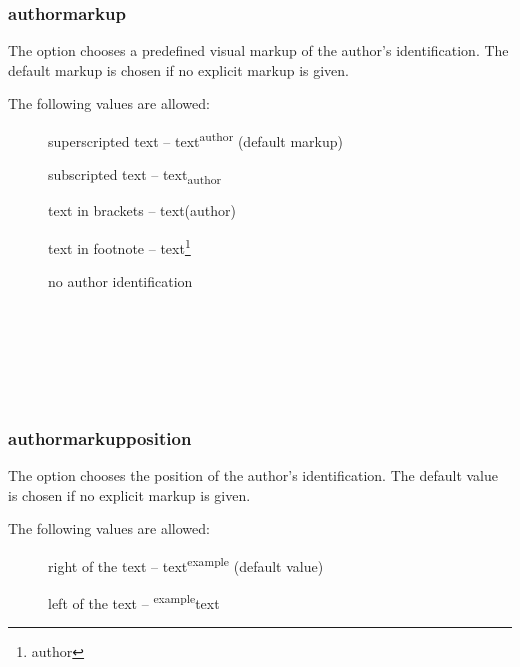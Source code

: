 \subsubsection{authormarkup}

The  option chooses a predefined visual markup of the author's identification.
The default markup is chosen if no explicit markup is given.

The following values are allowed:
\begin{description}
	\item [] superscripted text -- text\textsuperscript{author} (default markup)
	\item [] subscripted text -- text\textsubscript{author}
	\item [] text in brackets -- text(author)
	\item [] text in footnote -- text\footnote{author}
	\item [] no author identification
\end{description}

\begin{chusage}
		\>\\
	\usageexample
		\> \Corresponds\ \\
		\>\\
		\>\\
		\>\\
		\>
\end{chusage}



\subsubsection{authormarkupposition}

The  option chooses the position of the author's identification.
The default value is chosen if no explicit markup is given.

The following values are allowed:
\begin{description}
	\item [] right of the text -- text\textsuperscript{example} (default value)
	\item [] left of the text -- \textsuperscript{example}text
\end{description}

